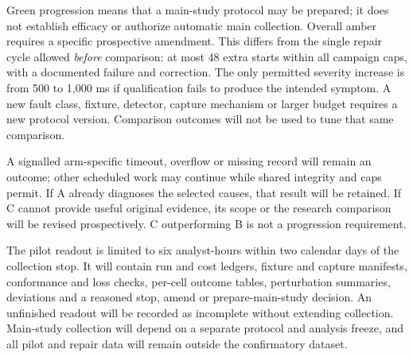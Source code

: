 Green progression means that a main-study protocol may be prepared; it does not establish efficacy or authorize automatic main collection. Overall amber requires a specific prospective amendment. This differs from the single repair cycle allowed \emph{before} comparison: at most 48 extra starts within all campaign caps, with a documented failure and correction. The only permitted severity increase is from 500 to 1,000 ms if qualification fails to produce the intended symptom. A new fault class, fixture, detector, capture mechanism or larger budget requires a new protocol version. Comparison outcomes will not be used to tune that same comparison.

A signalled arm-specific timeout, overflow or missing record will remain an outcome; other scheduled work may continue while shared integrity and caps permit. If A already diagnoses the selected causes, that result will be retained. If C cannot provide useful original evidence, its scope or the research comparison will be revised prospectively. C outperforming B is not a progression requirement.

The pilot readout is limited to six analyst-hours within two calendar days of the collection stop. It will contain run and cost ledgers, fixture and capture manifests, conformance and loss checks, per-cell outcome tables, perturbation summaries, deviations and a reasoned stop, amend or prepare-main-study decision. An unfinished readout will be recorded as incomplete without extending collection. Main-study collection will depend on a separate protocol and analysis freeze, and all pilot and repair data will remain outside the confirmatory dataset.

